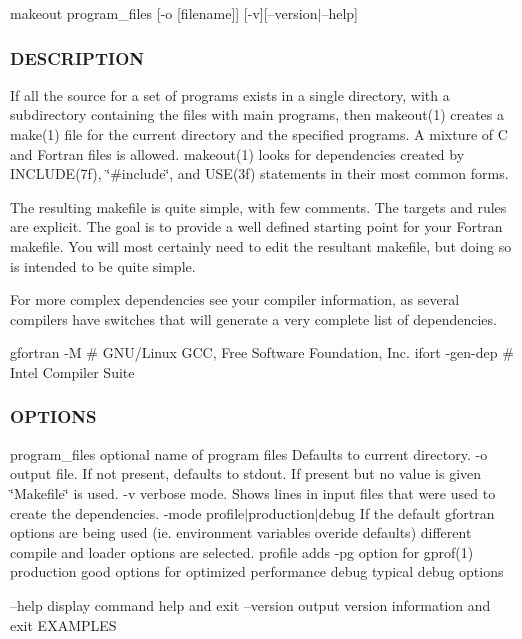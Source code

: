 makeout program\+\_\+files \mbox{[}-\/o \mbox{[}filename\mbox{]}\mbox{]} \mbox{[}-\/v\mbox{]}\mbox{[}--version$\vert$--help\mbox{]} \subsubsection*{D\+E\+S\+C\+R\+I\+P\+T\+I\+ON}

If all the source for a set of programs exists in a single directory, with a subdirectory containing the files with main programs, then makeout(1) creates a make(1) file for the current directory and the specified programs. A mixture of C and Fortran files is allowed. makeout(1) looks for dependencies created by I\+N\+C\+L\+U\+D\+E(7f), \char`\"{}\#include\char`\"{}, and U\+S\+E(3f) statements in their most common forms.

The resulting makefile is quite simple, with few comments. The targets and rules are explicit. The goal is to provide a well defined starting point for your Fortran makefile. You will most certainly need to edit the resultant makefile, but doing so is intended to be quite simple.

For more complex dependencies see your compiler information, as several compilers have switches that will generate a very complete list of dependencies. \begin{DoxyVerb} gfortran  -M        # GNU/Linux GCC, Free Software Foundation, Inc.
 ifort     -gen-dep  # Intel Compiler Suite
\end{DoxyVerb}


\subsubsection*{O\+P\+T\+I\+O\+NS}

program\+\_\+files optional name of program files Defaults to current directory. -\/o output file. If not present, defaults to stdout. If present but no value is given \char`\"{}\+Makefile\char`\"{} is used. -\/v verbose mode. Shows lines in input files that were used to create the dependencies. -\/mode profile$\vert$production$\vert$debug If the default gfortran options are being used (ie. environment variables overide defaults) different compile and loader options are selected. profile adds -\/pg option for gprof(1) production good options for optimized performance debug typical debug options

--help display command help and exit --version output version information and exit E\+X\+A\+M\+P\+L\+ES

